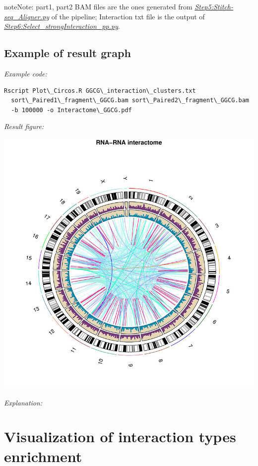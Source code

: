 \documentclass[letterpaper,10pt,english]{sphinxmanual}
\begin{document}
\begin{notice}{note}{Note:}
part1, part2 BAM files are the ones generated from {\hyperref[Analysis_pipeline:step5]{\emph{Step5:Stitch-seq\_Aligner.py}}} of the pipeline; Interaction txt file is the output of {\hyperref[Analysis_pipeline:step6]{\emph{Step6:Select\_strongInteraction\_pp.py}}}.
\end{notice}


\section{Example of result graph}
\label{Visualization:id5}
\emph{Example code:}

\begin{Verbatim}[commandchars=\\\{\}]
Rscript Plot\_Circos.R GGCG\_interaction\_clusters.txt
  sort\_Paired1\_fragment\_GGCG.bam sort\_Paired2\_fragment\_GGCG.bam
  -b 100000 -o Interactome\_GGCG.pdf
\end{Verbatim}

\emph{Result figure:}

\includegraphics{GGCG-MEF_interactome.jpg}

\emph{Explanation:}


\chapter{Visualization of interaction types enrichment}
\label{Visualization:visualizationenrich}\label{Visualization:visualization-of-interaction-types-enrichment}
\end{document}
